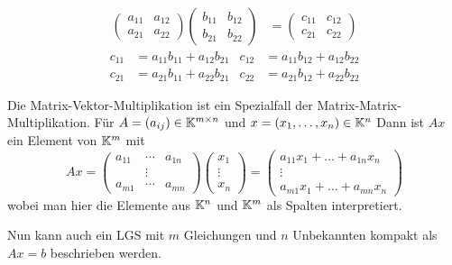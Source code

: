 \begin{bsp}\
	\begin{align*}
		\begin{pmatrix}
			a_{11} & a_{12} \\
			a_{21} & a_{22}
		\end{pmatrix}
		\begin{pmatrix}
			b_{11} & b_{12} \\
			b_{21} & b_{22}
		\end{pmatrix}
		&=
		\begin{pmatrix}
			c_{11} & c_{12} \\
			c_{21} & c_{22}
		\end{pmatrix} 
	\end{align*}
	\begin{align*}
		c_{11} &= a_{11}b_{11} + a_{12}b_{21}  & 
c_{12} &= a_{11}b_{12} + a_{12}b_{22} \\
c_{21} &= a_{21}b_{11} + a_{22}b_{21}  &
c_{22} &= a_{21}b_{12} + a_{22}b_{22}
	\end{align*}
\end{bsp}

\begin{bem}
	Die Matrix-Vektor-Multiplikation ist ein Spezialfall der Matrix-Matrix-Multiplikation. Für
	 $ A = (a_{ij}) \in \mathbb K^{m \times n} $ und $ x = (x_1, \ldots, x_n) \in \mathbb K^n $ Dann ist $Ax $ ein Element von $\mathbb K^m$ mit 
	\begin{equation*}
		Ax =
		\begin{pmatrix}
			a_{11} & \cdots & a_{1n} \\
			 &  \vdots &  \\
			a_{m1} & \cdots & a_{mn}
		\end{pmatrix}
		\begin{pmatrix}
			x_1 \\
			\vdots \\
			x_n
		\end{pmatrix}
		=
		\begin{pmatrix}
			a_{11}x_1 + \ldots + a_{1n}x_n \\
			\vdots \\
			a_{m1}x_1 + \ldots + a_{mn}x_n
		\end{pmatrix}
	\end{equation*}
	wobei man hier die Elemente aus $\mathbb K^n$ und $\mathbb K^m$ als Spalten interpretiert. 
	
	Nun kann auch ein LGS mit $m$ Gleichungen und $n$ Unbekannten kompakt als $A x = b$ beschrieben werden. 
\end{bem}

